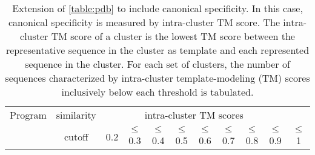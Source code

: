 \documentclass[11pt,letterpaper]{article}
\begin{document}
\pagebreak

\begin{table}[t]%
	\centering
	\caption{
		Extension of \cref{table:pdb} to include canonical specificity.
		In this case, canonical specificity is measured by intra-cluster TM score.
		The intra-cluster TM score of a cluster is the lowest TM score between the representative sequence in the cluster as template and each represented sequence in the cluster.
		For each set of clusters, the number of sequences characterized by intra-cluster template-modeling (TM) scores inclusively below each threshold is tabulated.
	}
	\begin{tabular}{l c c c c c c c c c c}
		\toprule
		Program & similarity & 
		\multicolumn{8}{c}{intra-cluster TM scores} \\
		& cutoff      & 0.2 &
		\(\le\) 0.3 & \(\le\) 0.4 & \(\le\) 0.5 
		& \(\le\) 0.6 & \(\le\) 0.7 & \(\le\) 0.8 & \(\le\) 0.9 & \(\le\) 1 \\
		\midrule
		

\end{tabular}
\end{table}
\end{document}
